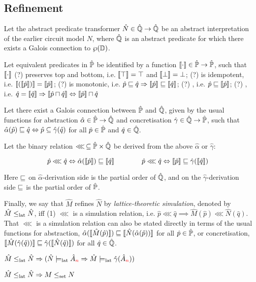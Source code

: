 \subsection{Refinement}

Let the abstract predicate transformer $\hat N \in \hat{\mathbb{Q}} \rightarrow \hat{\mathbb{Q}}$ be an abstract interpretation of the earlier circuit model $N$, where $\hat{\mathbb{Q}}$ is an abstract predicate for which there exists a Galois connection to $\wp(\mathbb{D})$.

Let equivalent predicates in $\hat{\mathbb{P}}$ be identified by a function $\llbracket \cdot \rrbracket \in \hat{\mathbb{P}} \rightarrow \hat{\mathbb{P}}$, such that $\llbracket \cdot \rrbracket$ (?) preserves top and bottom, i.e. $\llbracket \top \rrbracket = \top$ and $\llbracket \bot \rrbracket = \bot$; (?) is idempotent, i.e. $\llbracket (\llbracket \hat p \rrbracket) \rrbracket = \llbracket \hat p \rrbracket$; (?) is monotonic, i.e. $\hat p \sqsubseteq \hat q \Rightarrow \llbracket \hat p \rrbracket \sqsubseteq \llbracket \hat q \rrbracket$; (?) , i.e. $\hat p \sqsubseteq \llbracket \hat p \rrbracket$; (?) , i.e. $\hat q = \llbracket \hat q \rrbracket \Rightarrow \llbracket \hat p \sqcap \hat q \rrbracket \Leftrightarrow \llbracket \hat p \rrbracket \sqcap \hat q$

Let there exist a Galois connection between $\hat{\mathbb{P}}$ and $\hat{\mathbb{Q}}$, given by the usual functions for abstraction $\hat \alpha \in \hat{\mathbb{P}} \rightarrow \hat{\mathbb{Q}}$ and concretisation $\hat \gamma \in \hat{\mathbb{Q}} \rightarrow \hat{\mathbb{P}}$, such that $\hat \alpha(\hat p) \sqsubseteq \hat q \Leftrightarrow \hat p \subseteq \hat \gamma(\hat q)$ for all $\hat p \in \hat{\mathbb{P}}$ and $\hat q \in \hat{\mathbb{Q}}$.

Let the binary relation $\lll \, \subseteq \hat{\mathbb{P}} \times \hat{\mathbb{Q}}$ be derived from the above $\hat \alpha$ or $\hat \gamma$:

\begin{equation*}
\hat p \lll \hat q \Leftrightarrow \hat \alpha(\llbracket \hat p \rrbracket) \sqsubseteq \llbracket \hat q \rrbracket \quad\quad\quad\quad \hat p \lll \hat q \Leftrightarrow \llbracket \hat p \rrbracket \sqsubseteq \hat \gamma(\llbracket \hat q \rrbracket)
\end{equation*}

\noindent Here $\sqsubseteq$ on $\hat \alpha$-derivation side is the partial order of $\hat{\mathbb{Q}}$, and on the $\hat \gamma$-derivation side $\sqsubseteq$ is the partial order of $\hat{\mathbb{P}}$.

Finally, we say that $\hat M$ refines $\hat N$ by \textit{lattice-theoretic simulation}, denoted by $\hat M \leq_{\textrm{lat}} \hat N$, iff (1) $\lll$ is a simulation relation, i.e. $\hat p \lll \hat q \implies \hat M(\hat p) \lll \hat N(\hat q)$. That $\lll$ is a simulation relation can also be stated directly in terms of the usual functions for abstraction, $\hat \alpha(\llbracket \hat M(\hat p) \rrbracket) \sqsubseteq \llbracket \hat N(\hat \alpha(\hat p)) \rrbracket$ for all $\hat p \in \hat{\mathbb{P}}$, or concretisation, $\llbracket \hat M(\hat \gamma(\hat q)) \rrbracket \sqsubseteq \hat \gamma(\llbracket \hat N(\hat q) \rrbracket)$ for all $\hat q \in \hat{\mathbb{Q}}$.

\begin{theorem} \label{thm:lat-refines}
$\hat M \leq_{\textrm{lat}} \hat N \Rightarrow (\hat N \models_{\textrm{lat}} \hat{A}_{\textcolor{red}{n}} \Rightarrow \hat M \models_{\textrm{lat}} \hat \gamma(\hat{A}_{\textcolor{red}{n}}))$
\end{theorem}

\begin{theorem} \label{thm:lat-imply-set}
$\hat M \leq_{\textrm{lat}} \hat N \Rightarrow M \leq_{\textrm{set}} N$
\end{theorem}
